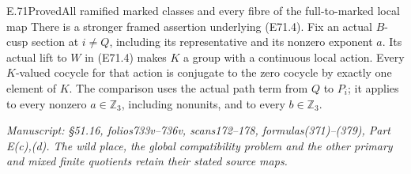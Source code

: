 \begin{statement}{E.71}{Proved}{All ramified marked classes and every fibre of the full-to-marked local map}
There is a stronger framed assertion underlying (E71.4).
Fix an actual $B$-cusp section at $i\ne Q$, including its
representative and its nonzero exponent $a$. Its actual lift
to $W$ in (E71.4) makes $K$ a group with a continuous local
action. Every $K$-valued cocycle for that action is conjugate
to the zero cocycle by exactly one element of $K$.
The comparison uses the actual path term from $Q$ to $P_i$;
it applies to every nonzero $a\in\mathbb Z_3$, including
nonunits, and to every $b\in\mathbb Z_3$.

\emph{Manuscript: \S51.16, folios733v--736v, scans172--178,
formulas(371)--(379), Part E(c),(d). The wild place, the
global compatibility problem and the other primary and
mixed finite quotients retain their stated source maps.}
\end{statement}

